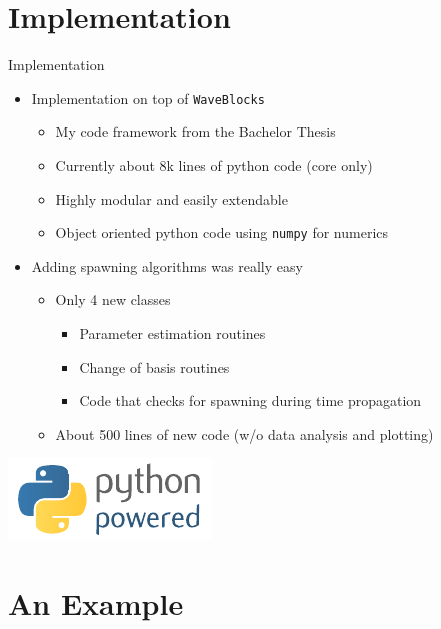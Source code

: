\documentclass{beamer}
\begin{document}
\section{Implementation}


\begin{frame}{Implementation}
  \begin{itemize}
    \item Implementation on top of \texttt{WaveBlocks}
    \begin{itemize}
      \item My code framework from the Bachelor Thesis
      \item Currently about 8k lines of python code (core only)
      \item Highly modular and easily extendable
      \item Object oriented python code using \texttt{numpy} for numerics
    \end{itemize}
    \item Adding spawning algorithms was really easy
    \begin{itemize}
      \item Only 4 new classes
      \begin{itemize}
        \item Parameter estimation routines
        \item Change of basis routines
        \item Code that checks for spawning during time propagation
      \end{itemize}
      \item About 500 lines of new code (w/o data analysis and plotting)
    \end{itemize}
  \end{itemize}
  \begin{center}
    \includegraphics[scale=1.0]{./fig/python-powered-w.pdf}
  \end{center}
\end{frame}


\section{An Example}
\end{document}
